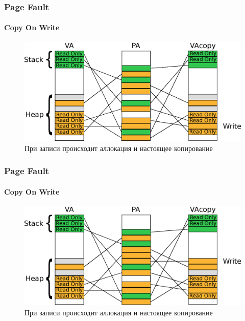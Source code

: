 \begin{frame}
\frametitle{Page Fault}
\framesubtitle{Copy On Write}

\begin{figure}
  \centering\includegraphics[width=.9\linewidth]{page-cow3}
  \caption{При записи происходит аллокация и настоящее копирование}
\end{figure}
\end{frame}

\begin{frame}
\frametitle{Page Fault}
\framesubtitle{Copy On Write}

\begin{figure}
  \centering\includegraphics[width=.9\linewidth]{page-cow4}
  \caption{При записи происходит аллокация и настоящее копирование}
\end{figure}
\end{frame}

